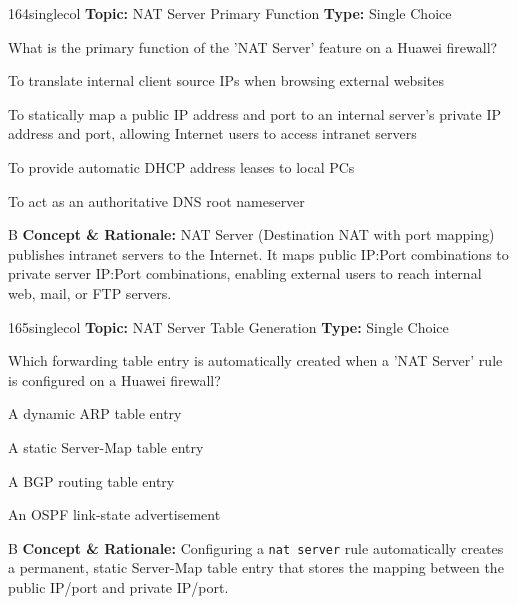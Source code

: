 \begin{qcard}{164}{singlecol}
\textcolor{darkslate!75}{\small\textbf{Topic:} NAT Server Primary Function \hfill \textbf{Type:} Single Choice}\vspace{0.4em}\par
What is the primary function of the 'NAT Server' feature on a Huawei firewall?
\begin{qoptions}
\item To translate internal client source IPs when browsing external websites
\item To statically map a public IP address and port to an internal server's private IP address and port, allowing Internet users to access intranet servers
\item To provide automatic DHCP address leases to local PCs
\item To act as an authoritative DNS root nameserver
\end{qoptions}
\end{qcard}
\nopagebreak
\begin{explainbox}{B}
\textbf{Concept \& Rationale:} NAT Server (Destination NAT with port mapping) publishes intranet servers to the Internet. It maps public IP:Port combinations to private server IP:Port combinations, enabling external users to reach internal web, mail, or FTP servers.
\end{explainbox}

\begin{qcard}{165}{singlecol}
\textcolor{darkslate!75}{\small\textbf{Topic:} NAT Server Table Generation \hfill \textbf{Type:} Single Choice}\vspace{0.4em}\par
Which forwarding table entry is automatically created when a 'NAT Server' rule is configured on a Huawei firewall?
\begin{qoptions}
\item A dynamic ARP table entry
\item A static Server-Map table entry
\item A BGP routing table entry
\item An OSPF link-state advertisement
\end{qoptions}
\end{qcard}
\nopagebreak
\begin{explainbox}{B}
\textbf{Concept \& Rationale:} Configuring a \texttt{nat server} rule automatically creates a permanent, static Server-Map table entry that stores the mapping between the public IP/port and private IP/port.
\end{explainbox}

